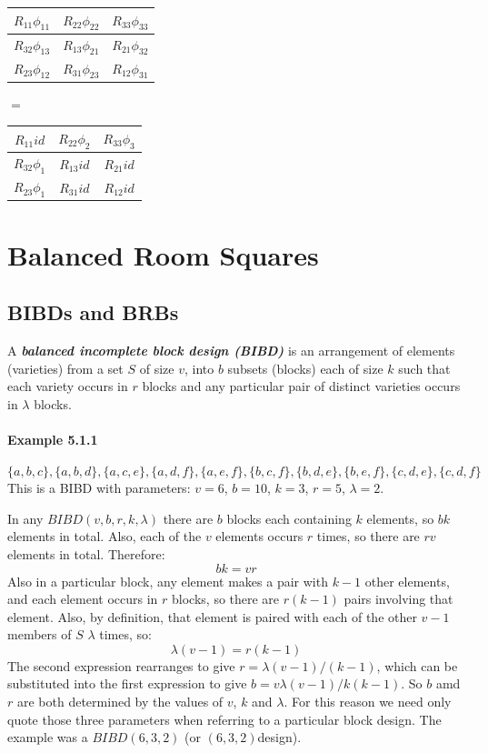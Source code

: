 \documentclass[
  12pt,
  a4paper]{book}
\begin{document}
\begin{longtable}[]{@{}ccc@{}}
\toprule
\(R_{11}\phi _{11}\) & \(R_{22}\phi _{22}\) & \(R_{33}\phi _{33}\)\tabularnewline
\midrule
\endhead
\(R_{32}\phi _{13}\) & \(R_{13}\phi _{21}\) & \(R_{21}\phi _{32}\)\tabularnewline
\(R_{23}\phi _{12}\) & \(R_{31}\phi _{23}\) & \(R_{12}\phi _{31}\)\tabularnewline
\bottomrule
\end{longtable}

\(=\)

\begin{longtable}[]{@{}ccc@{}}
\toprule
\(R_{11}id\) & \(R_{22}\phi _{2}\) & \(R_{33}\phi _{3}\)\tabularnewline
\midrule
\endhead
\(R_{32}\phi _{1}\) & \(R_{13}id\) & \(R_{21}id\)\tabularnewline
\(R_{23}\phi _{1}\) & \(R_{31}id\) & \(R_{12}id\)\tabularnewline
\bottomrule
\end{longtable}

\hypertarget{balanced-room-squares}{%
\chapter{Balanced Room Squares}\label{balanced-room-squares}}

\hypertarget{bibds-and-brbs}{%
\section{BIBDs and BRBs}\label{bibds-and-brbs}}

A \textbf{\emph{balanced incomplete block design (BIBD)}} is an arrangement of
elements (varieties) from a set \(S\) of size \(v\), into \(b\) subsets
(blocks) each of size \(k\) such that each variety occurs in \(r\) blocks
and any particular pair of distinct varieties occurs in \(\lambda\)
blocks.

\hypertarget{example-5.1.1}{%
\subsubsection{Example 5.1.1}\label{example-5.1.1}}

\[\{a,b,c\},\{a,b,d\},\{a,c,e\},\{a,d,f\},\{a,e,f\},\{b,c,f\},\{b,d,e\},\{b,e,f\},\{c,d,e\},\{c,d,f\}\]
This is a BIBD with parameters: \(v = 6\), \(b = 10\), \(k = 3\), \(r = 5\),
\(\lambda = 2\).

In any \(BIBD(v, b, r, k, \lambda)\) there are \(b\) blocks each containing \(k\)
elements, so \(bk\) elements in total. Also, each of the \(v\) elements
occurs \(r\) times, so there are \(rv\) elements in total. Therefore:
\[bk = vr\] Also in a particular block, any element makes a pair with
\(k - 1\) other elements, and each element occurs in \(r\) blocks, so there
are \(r(k - 1)\) pairs involving that element. Also, by definition, that
element is paired with each of the other \(v - 1\) members of \(S\) \(\lambda\)
times, so: \[\lambda (v - 1) = r(k - 1)\] The second expression rearranges
to give \(r = \lambda (v - 1)/(k - 1)\), which can be substituted into the first
expression to give \(b=v\lambda (v - 1)/k(k - 1)\). So \(b\) amd \(r\) are both
determined by the values of \(v\), \(k\) and \(\lambda\). For this reason we
need only quote those three parameters when referring to a particular
block design. The example was a \(BIBD(6, 3, 2)\) (or \((6, 3, 2)\)design).
\end{document}
